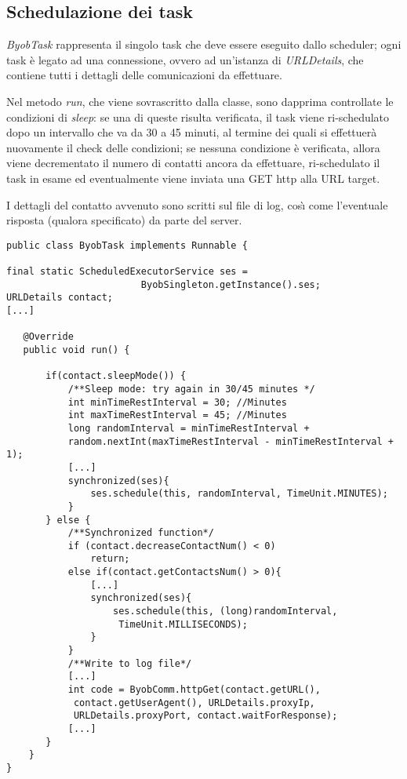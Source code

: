 \subsection{Schedulazione dei task}
\textit{ByobTask} rappresenta il singolo task che deve essere eseguito dallo scheduler; ogni task \`{e} legato ad una connessione, ovvero ad un'istanza di \textit{URLDetails}, che contiene tutti i dettagli delle comunicazioni da effettuare.

Nel metodo \textit{run}, che viene sovrascritto dalla classe, sono dapprima controllate le condizioni di \textit{sleep}: 
se una di queste risulta verificata, il task viene ri-schedulato dopo un intervallo che va da 30 a 45 minuti, al termine dei quali si effettuer\`{a} nuovamente il check delle condizioni;
se nessuna condizione \`{e} verificata, allora viene decrementato il numero di contatti ancora da effettuare, ri-schedulato il task in esame ed eventualmente viene inviata una GET http alla URL target.

I dettagli del contatto avvenuto sono scritti sul file di log, cos\`{\i} come l'eventuale risposta (qualora specificato) da parte del server.
\newpage
\vspace{0.5cm}
\begin{lstlisting}
public class ByobTask implements Runnable {

final static ScheduledExecutorService ses = 
						ByobSingleton.getInstance().ses;
URLDetails contact;
[...]

   @Override
   public void run() {
   
	   if(contact.sleepMode()) {
		   /**Sleep mode: try again in 30/45 minutes */
		   int minTimeRestInterval = 30; //Minutes
		   int maxTimeRestInterval = 45; //Minutes
		   long randomInterval = minTimeRestInterval + 
		   random.nextInt(maxTimeRestInterval - minTimeRestInterval + 1);
		   [...]
		   synchronized(ses){
			   ses.schedule(this, randomInterval, TimeUnit.MINUTES);
		   }
	   } else {        
		   /**Synchronized function*/
		   if (contact.decreaseContactNum() < 0) 
			   return; 
		   else if(contact.getContactsNum() > 0){
			   [...]
			   synchronized(ses){
				   ses.schedule(this, (long)randomInterval,
				    TimeUnit.MILLISECONDS);
			   }
		   }
		   /**Write to log file*/
		   [...]
		   int code = ByobComm.httpGet(contact.getURL(),
		    contact.getUserAgent(), URLDetails.proxyIp, 
		    URLDetails.proxyPort, contact.waitForResponse);
	       [...]
	   }
	}
}
\end{lstlisting}

